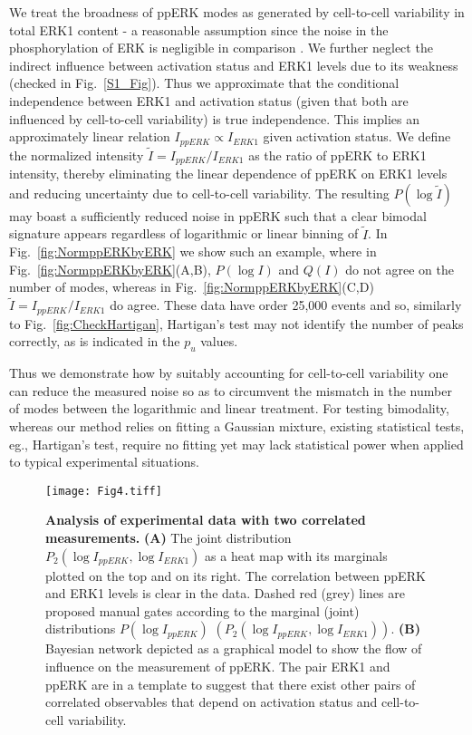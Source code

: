 \documentclass[11pt,a4paper,draft]{article}
\begin{document}
We treat the broadness of ppERK modes as generated by cell-to-cell variability in total ERK1 content - a reasonable assumption since the noise in the phosphorylation of ERK is negligible in comparison \cite{Filippi2016}. We further neglect the indirect influence between activation status and ERK1 levels due to its weakness (checked in Fig.~\ref{S1_Fig}). Thus we approximate that the conditional independence between ERK1 and activation status (given that both are influenced by cell-to-cell variability) is true independence. This implies an approximately linear relation $I_{ppERK} \propto I_{ERK1}$ given activation status.
We define the normalized intensity $\tilde{I} = I_{ppERK}/I_{ERK1}$ as the ratio of ppERK to ERK1 intensity, thereby eliminating the linear dependence of ppERK on ERK1 levels and reducing uncertainty due to cell-to-cell variability. The resulting $P(\log \tilde{I})$ may boast a sufficiently reduced noise in ppERK such that a clear bimodal signature appears regardless of logarithmic or linear binning of $\tilde{I}$. In Fig.~\ref{fig:NormppERKbyERK} we show such an example, where in Fig.~\ref{fig:NormppERKbyERK}(A,B), $P(\log I)$ and $Q(I)$ do not agree on the number of modes, whereas in Fig.~\ref{fig:NormppERKbyERK}(C,D) $\tilde{I} = I_{ppERK} / I_{ERK1}$ do agree. These data have order 25,000 events and so, similarly to Fig.~\ref{fig:CheckHartigan}, Hartigan's test may not identify the number of peaks correctly, as is indicated in the $p_u$ values.

Thus we demonstrate how by suitably accounting for cell-to-cell variability one can reduce the measured noise so as to circumvent the mismatch in the number of modes between the logarithmic and linear treatment. For testing bimodality, whereas our method relies on fitting a Gaussian mixture, existing statistical tests, eg., Hartigan's test, require no fitting yet may lack statistical power when applied to typical experimental situations. 
\smallskip

\begin{figure}
    \centering
    \texttt{[image: Fig4.tiff]}
   \caption{\textbf{Analysis of experimental data with two correlated measurements.} \textbf{(A)} The joint distribution $P_2(\log I_{ppERK},\log I_{ERK1})$ as a heat map with its marginals plotted on the top and on its right. The correlation between ppERK and ERK1 levels is clear in the data. Dashed red (grey) lines are proposed manual gates according to the marginal (joint) distributions $P(\log I_{ppERK})$ $\left(P_2(\log I_{ppERK},\log I_{ERK1})\right)$. \textbf{(B)} Bayesian network depicted as a graphical model to show the flow of influence on the measurement of ppERK. The pair ERK1 and ppERK are in a template to suggest that there exist other pairs of correlated observables that depend on activation status and cell-to-cell variability.}
   \label{fig:ppERKvsERK1heatmap}
\end{figure}
\end{document}
